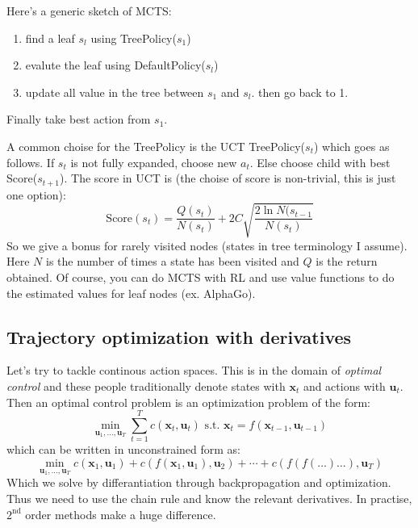 \documentclass{report}
\begin{document}
Here's a generic sketch of MCTS:
\begin{enumerate}
		\item find a leaf $s_l$ using TreePolicy($s_1$)
		\item evalute the leaf using DefaultPolicy($s_l$)
		\item update all value in the tree between $s_1$ and $s_l$. then go back to 1.
\end{enumerate}
Finally take best action from $s_1$.

A common choise for the TreePolicy is the UCT TreePolicy($s_t$)
which goes as follows. If $s_t$ is not fully expanded, choose new $a_t$. Else 
choose child with best Score($s_{t+1}$).
The score in UCT is (the choise of score is non-trivial, this is just one option):
\begin{equation}
		\text{Score}(s_t) = \frac{Q(s_t)}{N(s_t)} + 2C \sqrt{ \frac{2 \ln N(s_{t-1}}{N(s_t)}  } 
\end{equation}
So we give a bonus for rarely visited nodes (states in tree terminology I assume).
Here $N$ is the number of times a state has been visited and $Q$ is the return obtained.
Of course, you can do MCTS with RL and use value functions to do the estimated values for leaf nodes (ex. AlphaGo).

\subsection{Trajectory optimization with derivatives}
Let's try to tackle continous action spaces.
This is in the domain of \textit{optimal control} and these people traditionally
denote states with $ \bm{x}_{t}  $ and actions with $ \bm{u}_{t}  $.
Then an optimal control problem is an optimization problem of the form:
\begin{equation}
		\min_{\bm{u}_{1}, \dots, \bm{u}_{T}} \sum_{t=1}^{T} c(\bm{x}_{t}, \bm{u}_{t} ) \text{ s.t. } \bm{x}_{t} = f (\bm{x}_{t-1}, \bm{u}_{t-1} )
\end{equation}
which can be written in unconstrained form as:
\begin{equation}
		\min_{\bm{u}_{1}, \dots, \bm{u}_{T}} 
		c (\bm{x}_{1}, \bm{u}_{1} ) + c (f(\bm{x}_{1}, \bm{u}_{1} ), \bm{u}_{2}) + \cdots + c ( f  (f ( \dots) \dots), \bm{u}_{T}) 
\end{equation}
Which we solve by differantiation through backpropagation and optimization.
Thus we need to use the chain rule and know the relevant derivatives.
In practise, $ 2^{ \text{nd} }  $ order methods make a huge difference.
\end{document}
